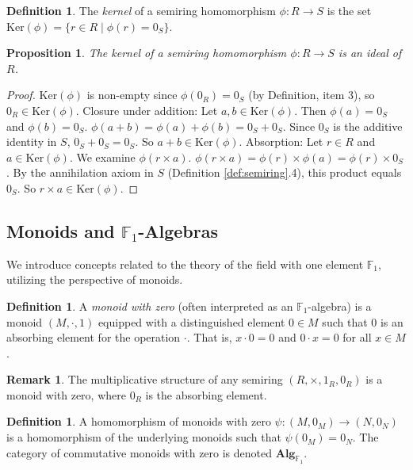 \documentclass[11pt, a4paper]{article}
\theoremstyle{plain}
\newtheorem{proposition}[theorem]{Proposition}
\theoremstyle{definition}
\newtheorem{definition}[theorem]{Definition}
\newtheorem{remark}[theorem]{Remark}
\numberwithin{equation}{section}
\newcommand{\Ker}{\mathrm{Ker}}
\newcommand{\FOne}{\mathbb{F}_1}
\begin{document}
\begin{definition}
The \emph{kernel} of a semiring homomorphism $\phi: R \to S$ is the set $\Ker(\phi) = \{r \in R \mid \phi(r) = 0_S\}$.
\end{definition}

\begin{proposition}\label{prop:kernel_is_ideal}
The kernel of a semiring homomorphism $\phi: R \to S$ is an ideal of $R$.
\end{proposition}
\begin{proof}
$\Ker(\phi)$ is non-empty since $\phi(0_R)=0_S$ (by Definition, item 3), so $0_R \in \Ker(\phi)$.
Closure under addition: Let $a, b \in \Ker(\phi)$. Then $\phi(a)=0_S$ and $\phi(b)=0_S$. $\phi(a+b) = \phi(a)+\phi(b) = 0_S+0_S$. Since $0_S$ is the additive identity in $S$, $0_S+0_S=0_S$. So $a+b \in \Ker(\phi)$.
Absorption: Let $r \in R$ and $a \in \Ker(\phi)$. We examine $\phi(r\times a)$. $\phi(r\times a) = \phi(r)\times\phi(a) = \phi(r)\times 0_S$. By the annihilation axiom in $S$ (Definition \ref{def:semiring}.4), this product equals $0_S$. So $r\times a \in \Ker(\phi)$.
\end{proof}

\subsection{Monoids and $\FOne$-Algebras}

We introduce concepts related to the theory of the field with one element $\FOne$, utilizing the perspective of monoids.

\begin{definition}\label{def:monoid_with_zero}
A \emph{monoid with zero} (often interpreted as an $\FOne$-algebra) is a monoid $(M, \cdot, 1)$ equipped with a distinguished element $0 \in M$ such that $0$ is an absorbing element for the operation $\cdot$. That is, $x\cdot 0 = 0$ and $0\cdot x = 0$ for all $x \in M$.
\end{definition}

\begin{remark}
The multiplicative structure of any semiring $(R, \times, 1_R, 0_R)$ is a monoid with zero, where $0_R$ is the absorbing element.
\end{remark}

\begin{definition}
A homomorphism of monoids with zero $\psi: (M, 0_M) \to (N, 0_N)$ is a homomorphism of the underlying monoids such that $\psi(0_M)=0_N$. The category of commutative monoids with zero is denoted $\mathbf{Alg}_{\FOne}$.
\end{definition}
\end{document}
